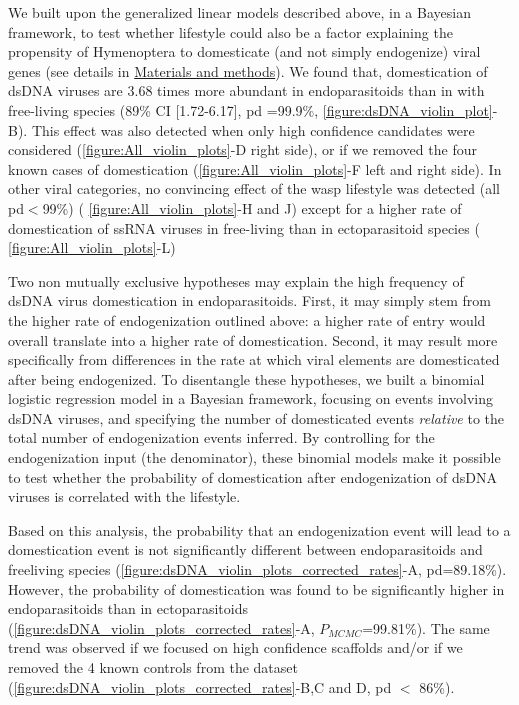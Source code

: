 We built upon the generalized linear models described above, in a Bayesian framework, to test whether lifestyle could also be a factor explaining the propensity of Hymenoptera to domesticate (and not simply endogenize) viral genes (see details in \hyperref[sec:MM-5]{Materials and methods}). We found that, domestication of dsDNA viruses are 3.68 times more abundant in endoparasitoids than  in with free-living species (89\% CI [1.72-6.17], pd =99.9\%, \figurename{\ref{figure:dsDNA_violin_plot}}-B). This effect was also detected when only high confidence candidates were considered (\figurename{\ref{figure:All_violin_plots}}-D right side), or if we removed the four known cases of domestication (\figurename{\ref{figure:All_violin_plots}}-F left and right side). In other viral categories, no convincing effect of the wasp lifestyle was detected (all pd$<$99\%) (\figurename{ \ref{figure:All_violin_plots}-H and J}) except
for a higher rate of domestication of ssRNA viruses in free-living than in ectoparasitoid species (\figurename{ \ref{figure:All_violin_plots}-L})

Two non mutually exclusive hypotheses may explain the high frequency of dsDNA virus domestication in endoparasitoids. First, it may simply stem from the higher rate of endogenization outlined above: a higher rate of entry would overall  translate into a higher rate of domestication. Second, it may result more specifically from differences in the rate at which viral elements are domesticated after being endogenized. To disentangle these hypotheses, we built a binomial logistic regression model in a Bayesian framework, focusing on events involving dsDNA viruses, and specifying the number of domesticated events \textit{relative} to the total number of endogenization events inferred. By controlling for the endogenization input (the denominator), these binomial models make it possible to test whether the probability of domestication  after endogenization of dsDNA viruses is correlated with the lifestyle.

Based on this analysis, the probability that an endogenization event will lead to a domestication event is not significantly different between endoparasitoids and freeliving species (\figurename{\ref{figure:dsDNA_violin_plots_corrected_rates}}-A, pd=89.18\%). However, the probability of domestication was found to be significantly higher in endoparasitoids than in ectoparasitoids (\figurename{\ref{figure:dsDNA_violin_plots_corrected_rates}}-A, $P_{MCMC}$=99.81\%). The same trend was observed if we focused on high confidence scaffolds and/or if we removed the 4 known controls from the dataset (\figurename{\ref{figure:dsDNA_violin_plots_corrected_rates}}-B,C and D, pd $<$ 86\%).

